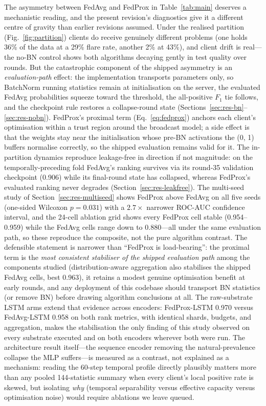 The asymmetry between FedAvg and FedProx in
Table~\ref{tab:main} deserves a mechanistic reading, and the present
revision's diagnostics give it a different centre of gravity than earlier
revisions assumed. Under the realised partition
(Fig.~\ref{fig:partition}) clients do receive genuinely different
problems (one holds 36\% of the data at a 29\% flare rate, another
2\% at 43\%), and client drift is real---the no-BN control shows
both algorithms decaying gently in test quality over rounds. But the
catastrophic component of the shipped asymmetry is an
\emph{evaluation-path} effect: the implementation transports
parameters only, so BatchNorm running statistics remain at
initialisation on the server, the evaluated FedAvg probabilities
squeeze toward the threshold, the all-positive $F_1$ tie follows, and
the checkpoint rule restores a collapse-round state
(Sections~\ref{sec:res-bn}--\ref{sec:res-nobn}). FedProx's proximal
term (Eq.~\eqref{eq:fedprox}) anchors each client's optimisation
within a trust region around the broadcast model; a side effect is
that the weights stay near the initialisation whose pre-BN
activations the (0, 1) buffers normalise correctly, so the shipped
evaluation remains valid for it. The in-partition dynamics reproduce
leakage-free in direction if not magnitude: on the
temporally-preceding fold FedAvg's ranking survives via its round-35
validation checkpoint (0.906) while its final-round state has
collapsed, whereas FedProx's evaluated ranking never degrades
(Section~\ref{sec:res-leakfree}). The multi-seed study of
Section~\ref{sec:res-multiseed} shows FedProx above FedAvg on all five
seeds (one-sided Wilcoxon $p=0.031$) with a $2.7\times$ narrower
ROC-AUC confidence interval, and the 24-cell ablation grid shows every
FedProx cell stable (0.954--0.959) while the FedAvg cells range down
to 0.880---all under the same evaluation path, so these reproduce the
composite, not the pure algorithm contrast. The defensible statement
is narrower than ``FedProx is load-bearing'': the proximal term is the
\emph{most consistent stabiliser of the shipped evaluation path}
among the components studied (distribution-aware aggregation also
stabilises the shipped FedAvg cells, best 0.963), it retains a modest
genuine optimisation benefit at early rounds, and any deployment of
this codebase should transport BN statistics (or remove BN) before
drawing algorithm conclusions at all. The raw-substrate
LSTM arms extend that evidence across encoders: FedProx-LSTM 0.970
versus FedAvg-LSTM 0.958 on both rank metrics, with identical
shards, budgets, and aggregation, makes the stabilisation the only
finding of this study observed on every substrate executed and on
both encoders wherever both were run. The architecture result itself---the sequence
encoder removing the natural-prevalence collapse the MLP
suffers---is measured as a contrast, not explained as a mechanism:
reading the 60-step temporal profile directly plausibly matters more
than any pooled 144-statistic summary when every client's local
positive rate is skewed, but isolating \emph{why} (temporal
separability versus effective capacity versus optimisation noise)
would require ablations we leave queued.


